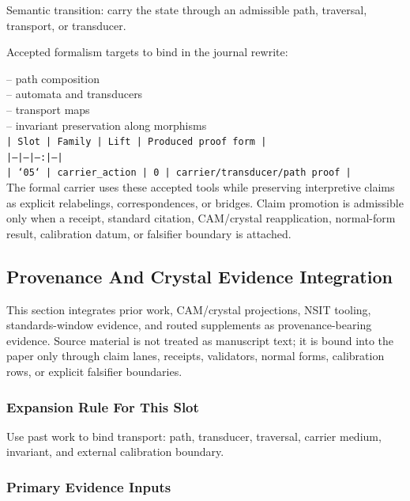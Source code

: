 \documentclass[11pt]{article}
\begin{document}
Semantic transition: carry the state through an admissible path, traversal, transport, or transducer.

Accepted formalism targets to bind in the journal rewrite:

\noindent{}-- path composition\\
\noindent{}-- automata and transducers\\
\noindent{}-- transport maps\\
\noindent{}-- invariant preservation along morphisms\\

\noindent\texttt{| Slot | Family | Lift | Produced proof form |}\\
\noindent\texttt{|---|---|---:|---|}\\
\noindent\texttt{| `05` | carrier\_action | 0 | carrier/transducer/path proof |}\\

The formal carrier uses these accepted tools while preserving interpretive
claims as explicit relabelings, correspondences, or bridges. Claim promotion is admissible only when a receipt, standard citation,
CAM/crystal reapplication, normal-form result, calibration datum, or falsifier
boundary is attached.

\subsection*{Provenance And Crystal Evidence Integration}

This section integrates prior work, CAM/crystal projections, NSIT tooling,
standards-window evidence, and routed supplements as provenance-bearing
evidence. Source material is not treated as manuscript text; it is bound into
the paper only through claim lanes, receipts, validators, normal forms,
calibration rows, or explicit falsifier boundaries.

\subsubsection*{Expansion Rule For This Slot}

Use past work to bind transport: path, transducer, traversal, carrier medium, invariant, and external calibration boundary.

\subsubsection*{Primary Evidence Inputs}
\end{document}
